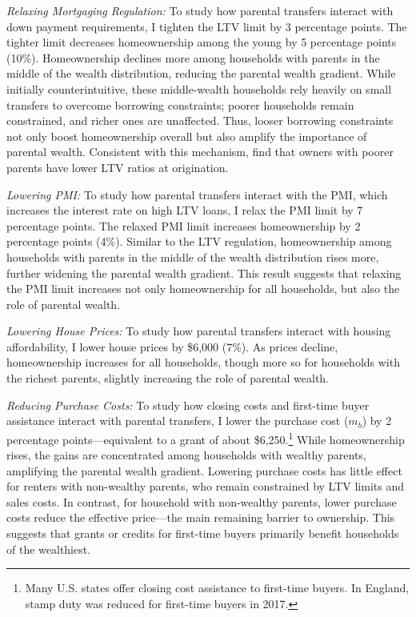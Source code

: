 \documentclass[12pt]{article}
\begin{document}
\textit{Relaxing Mortgaging Regulation:} To study how parental transfers interact with down payment requirements, I tighten the LTV limit by 3 percentage points. The tighter limit decreases homeownership among the young by 5 percentage points (10\%). Homeownership declines more among households with parents in the middle of the wealth distribution, reducing the parental wealth gradient. While initially counterintuitive, these middle-wealth households rely heavily on small transfers to overcome borrowing constraints; poorer households remain constrained, and richer ones are unaffected. Thus, looser borrowing constraints not only boost homeownership overall but also amplify the importance of parental wealth. Consistent with this mechanism, \citet{wold2024housing} find that owners with poorer parents have lower LTV ratios at origination.

\textit{Lowering PMI:} To study how parental transfers interact with the PMI, which increases the interest rate on high LTV loans, I relax the PMI limit by 7 percentage points. The relaxed PMI limit increases homeownership by 2 percentage points (4\%). Similar to the LTV regulation, homeownership among households with parents in the middle of the wealth distribution rises more, further widening the parental wealth gradient. This result suggests that relaxing the PMI limit increases not only homeownership for all households, but also the role of parental wealth.

\textit{Lowering House Prices:} To study how parental transfers interact with housing affordability, I lower house prices by \$6,000 (7\%). As prices decline, homeownership increases for all households, though more so for households with the richest parents, slightly increasing the role of parental wealth.

\textit{Reducing Purchase Costs:} To study how closing costs and first-time buyer assistance interact with parental transfers, I lower the purchase cost ($m_b$) by 2 percentage points---equivalent to a grant of about \$6,250.\footnote{Many U.S. states offer closing cost assistance to first-time buyers. In England, stamp duty was reduced for first-time buyers in 2017.} While homeownership rises, the gains are concentrated among households with wealthy parents, amplifying the parental wealth gradient. Lowering purchase costs has little effect for renters with non-wealthy parents, who remain constrained by LTV limits and sales costs. In contrast, for household with non-wealthy parents, lower purchase costs reduce the effective price—the main remaining barrier to ownership. This suggests that grants or credits for first-time buyers primarily benefit households of the wealthiest.
 
\end{document}
